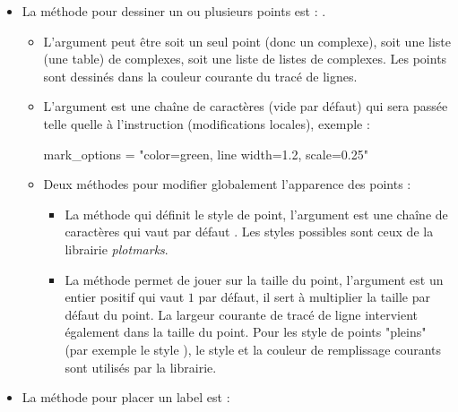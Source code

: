 \begin{itemize}
\item La méthode pour dessiner un ou plusieurs points est : .

    \begin{itemize}
    \item L'argument  peut être soit un seul point (donc un complexe), soit une liste (une table) de complexes, soit une liste de listes de complexes. Les points sont dessinés dans la couleur courante du tracé de lignes.
    \item L'argument  est une chaîne de caractères (vide par défaut) qui sera passée telle quelle à l'instruction \drawcmd (modifications locales), exemple :
\begin{TeXcode}
    mark_options = "color=green, line width=1.2, scale=0.25"
\end{TeXcode}

    \item Deux méthodes pour modifier globalement l'apparence des points :
        \begin{itemize}
        \item La méthode  qui définit le style de point, l'argument  est une chaîne de caractères qui vaut par défaut . Les styles possibles sont ceux de la librairie \emph{plotmarks}.
        \item La méthode  permet de jouer sur la taille du point, l'argument  est un entier positif qui vaut $1$ par défaut, il sert à multiplier la taille par défaut du point. La largeur courante de tracé de ligne intervient également dans la taille du point. Pour les style de points "pleins" (par exemple le style ), le style et la couleur de remplissage courants sont utilisés par la librairie.
        \end{itemize}
    \end{itemize}
    
\item La méthode pour placer un label est : 


\end{itemize}
